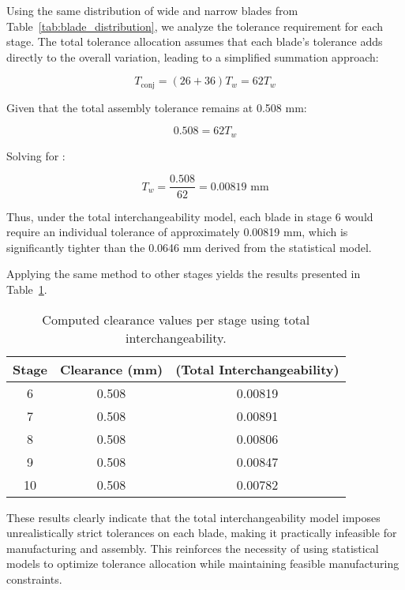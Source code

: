 Using the same distribution of wide and narrow blades from Table~\ref{tab:blade_distribution}, we analyze the tolerance requirement for each stage. The total tolerance allocation assumes that each blade's tolerance adds directly to the overall variation, leading to a simplified summation approach:

\begin{equation}
T_{\text{conj}} = (26 + 36) T_w = 62 T_w
\end{equation}

Given that the total assembly tolerance remains at 0.508 mm:

\begin{equation}
0.508 = 62 T_w
\end{equation}

Solving for :

\begin{equation}
T_w = \frac{0.508}{62} = 0.00819 \text{ mm}
\end{equation}

Thus, under the total interchangeability model, each blade in stage 6 would require an individual tolerance of approximately 0.00819 mm, which is significantly tighter than the 0.0646 mm derived from the statistical model.

Applying the same method to other stages yields the results presented in Table~\ref{tab:clearance_interchangeability}.

\begin{table}[h]
    \centering
    \begin{tabular}{@{}ccc@{}}
        \toprule
        Stage & Clearance (mm) &  \newline (Total Interchangeability) \\
        \midrule
        6  & 0.508 & 0.00819    \\
        7  & 0.508 & 0.00891    \\
        8  & 0.508 & 0.00806    \\
        9  & 0.508 & 0.00847    \\
        10 & 0.508 & 0.00782    \\
        \bottomrule
    \end{tabular}
    \caption{Computed clearance values per stage using total interchangeability.}
    \label{tab:clearance_interchangeability}
\end{table}

These results clearly indicate that the total interchangeability model imposes unrealistically strict tolerances on each blade, making it practically infeasible for manufacturing and assembly. This reinforces the necessity of using statistical models to optimize tolerance allocation while maintaining feasible manufacturing constraints.

